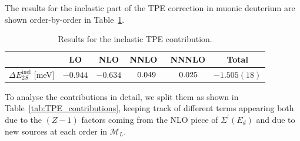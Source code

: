 \documentclass[prl,
twocolumn,
showpacs,preprintnumbers,amsmath,amssymb,
superscriptaddress,
a4paper,nofootinbib,longbibliography]{revtex4-2}
\def\hpm{\hphantom{-}}
\begin{document}
The results for the inelastic part of the TPE correction in muonic deuterium are shown order-by-order in Table~\ref{tab:TPE_results}.
\begin{table}[hbt]
\begin{tabular}{c||c c c c|| c}
                         & LO       & NLO       & NNLO      &\ NNNLO   & Total\\
\hline
\hline
$\Delta E_{2S}^\mathrm{inel}$ [meV]    &\parbox{0.1\textwidth}{$-0.944$} & \parbox{0.1\textwidth}{$-0.634$}  & \parbox{0.1\textwidth}{$\hpm 0.049$}  & \parbox{0.1\textwidth}{$\hpm 0.025$} & \parbox{0.11\textwidth}{$-1.505(18)$}    
\end{tabular}
\caption{Results for the inelastic TPE contribution.}
\label{tab:TPE_results}
\end{table}
To analyse the contributions in detail, we split them as shown in Table~\ref{tab:TPE_contributions}, keeping track of different terms appearing both due to the $(Z-1)$ factors coming from the NLO piece of $\Sigma^\prime(E_d)$ and due to new sources at each order in $\mathcal{M}_L$.
\end{document}
